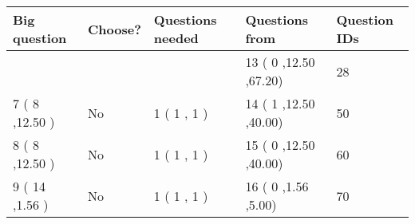 \documentclass[12pt]{article}
\begin{document}
   
\noindent\hspace{-0.4in}\begin{tabular}{|l|l|l|l|l|}
\hline
 Big question & Choose? & Questions needed & Questions from & Question IDs \\ 
\hline
  & & &           13 (           0
 ,12.50
 ,67.20) &           28  \\
 \hline
           7 (           8 ,12.50
 ) &  No   & 
           1 (           1 ,            1 ) &           14 (           1
,12.50
 ,40.00) &           50  \\
 \hline
           8 (           8 ,12.50
 ) &  No   & 
           1 (           1 ,            1 ) &           15 (           0
,12.50
 ,40.00) &           60  \\
 \hline
           9 (          14 ,1.56
 ) &  No   & 
           1 (           1 ,            1 ) &           16 (           0
,1.56
 ,5.00) &           70  \\
 \hline
 \end{tabular}
 
 
\end{document}
